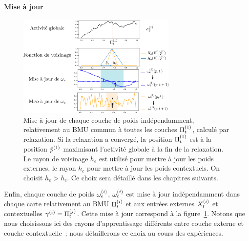 \documentclass[../main]{subfiles}
\begin{document}
\paragraph{Mise à jour}
\begin{figure}
    \centering
    \includegraphics[width=0.7\textwidth]{maj_2som.pdf}
    \caption{Mise à jour de chaque couche de poids indépendamment, relativement au BMU commun à toutes les couches $\Pi^{({1})}_t$, calculé par relaxation. Si la relaxation a convergé, la position $\Pi^{({1})}_t$ est à la position $\hat{p}^{({1})}$ maximisant l'activité globale à la fin de la relaxation. Le rayon de voisinage $h_e$ est utilisé pour mettre à jour les poids externes, le rayon $h_c$ pour mettre à jour les poids contextuels. On choisit $h_e > h_c$.
    Ce choix sera détaillé dans les chapitres suivants.\label{fig:maj}}
    \end{figure}
Enfin, chaque couche de poids $\omega_{e}^{({i})}$, $\omega_c^{({i})}$ est mise à jour indépendamment dans chaque carte relativement au BMU $\Pi^{({i})}_t$ et aux entrées externes $X^{({i})}_t$ et contextuelles $\gamma^{({i})} = \Pi^{({j})}_t$. Cette mise à jour correspond à la figure~\ref{fig:maj}. 
Notons que nous choisissons ici des rayons d'apprentissage différents entre couche externe et couche contextuelle~; nous détaillerons ce choix au cours des expériences.
\end{document}
